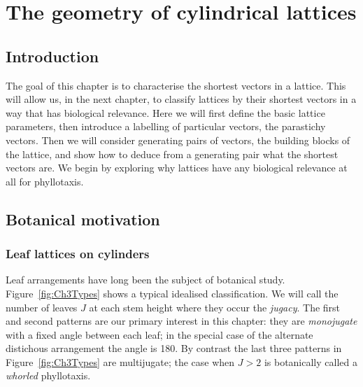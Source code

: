 

\chapter{The geometry of cylindrical lattices}
\label{ch:cylinder}
\section{Introduction}
The goal of this chapter is to characterise the shortest vectors in a lattice. This will allow us, in the next chapter, to classify lattices by their shortest vectors in a way that has biological relevance. Here we will first define the basic lattice parameters, then introduce a labelling of particular vectors, the parastichy vectors. Then we will consider generating pairs of vectors,  the building blocks of the lattice, and show how to deduce from a generating pair  what the shortest vectors are. We begin by exploring why lattices have any biological relevance at all for phyllotaxis.

\clearpage
\section{Botanical motivation}
\subsection{Leaf lattices on cylinders}

Leaf arrangements have long been the subject of botanical study. Figure~\ref{fig:Ch3Types} shows a typical idealised classification. We will call the number of leaves $J$ at each stem height where they occur the \textit{jugacy}. The first and second patterns are our primary interest in this chapter: they are \textit{monojugate} with a fixed angle between each leaf; in the special case of the alternate distichous arrangement the angle is 180\degree.
By contrast the last three patterns in Figure~\ref{fig:Ch3Types} are multijugate; the case when $J>2$ is botanically called a \textit{whorled} phyllotaxis.
  

